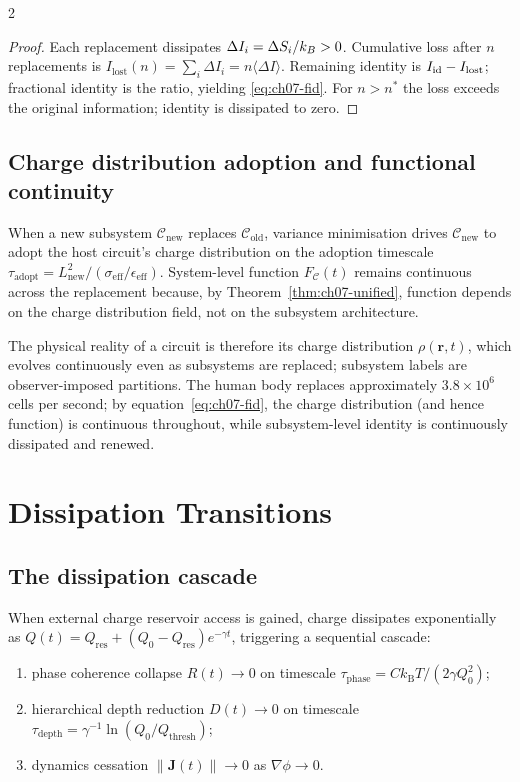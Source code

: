 \begin{multicols}{2}
\begin{proof}
Each replacement dissipates $\Delta I_i = \Delta S_i/k_B > 0$.  Cumulative
loss after $n$ replacements is $I_{\mathrm{lost}}(n) = \sum_i\Delta I_i =
n\langle\Delta I\rangle$.  Remaining identity is $I_{\mathrm{id}} - I_{\mathrm{lost}}$;
fractional identity is the ratio, yielding \eqref{eq:ch07-fid}.  For $n > n^*$
the loss exceeds the original information; identity is dissipated to zero.
\end{proof}

\subsection{Charge distribution adoption and functional continuity}

When a new subsystem $\mathcal{C}_{\mathrm{new}}$ replaces
$\mathcal{C}_{\mathrm{old}}$, variance minimisation drives
$\mathcal{C}_{\mathrm{new}}$ to adopt the host circuit's charge distribution
on the adoption timescale $\tau_{\mathrm{adopt}} = L_{\mathrm{new}}^2/
(\sigma_{\mathrm{eff}}/\epsilon_{\mathrm{eff}})$.  System-level function
$F_\mathcal{C}(t)$ remains continuous across the replacement because, by
Theorem~\ref{thm:ch07-unified}, function depends on the charge distribution
field, not on the subsystem architecture.

The physical reality of a circuit is therefore its charge distribution
$\rho(\mathbf{r},t)$, which evolves continuously even as subsystems are
replaced; subsystem labels are observer-imposed partitions.  The human body
replaces approximately $3.8\!\times\!10^6$ cells per second; by
equation~\eqref{eq:ch07-fid}, the charge distribution (and hence function)
is continuous throughout, while subsystem-level identity is continuously
dissipated and renewed.

\section{Dissipation Transitions}
\label{sec:ch07-dissipation}

\subsection{The dissipation cascade}

\begin{theorem}
\label{thm:ch07-cascade}
When external charge reservoir access is gained, charge dissipates
exponentially as $Q(t) = Q_{\mathrm{res}} + (Q_0 - Q_{\mathrm{res}})
e^{-\gamma t}$, triggering a sequential cascade:
\begin{enumerate}[label=(\roman*),itemsep=2pt]
  \item phase coherence collapse $R(t) \to 0$ on timescale
        $\tau_{\mathrm{phase}} = Ck_{\mathrm{B}}T/(2\gamma Q_0^2)$;
  \item hierarchical depth reduction $D(t) \to 0$ on timescale
        $\tau_{\mathrm{depth}} = \gamma^{-1}\ln(Q_0/Q_{\mathrm{thresh}})$;
  \item dynamics cessation $\|\mathbf{J}(t)\| \to 0$ as $\nabla\phi \to 0$.
\end{enumerate}
\end{theorem}


\end{multicols}
